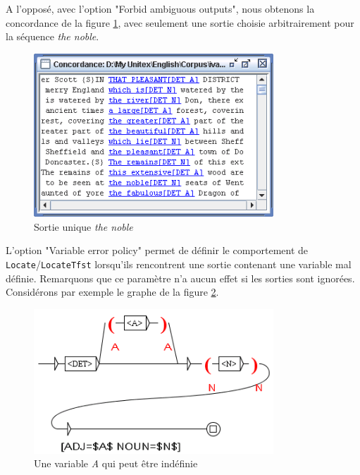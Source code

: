 \noindent A l'opposé, avec l'option "Forbid ambiguous
outputs", nous obtenons la concordance de la figure \ref{fig6-advanced-options4},
avec seulement une sortie choisie arbitrairement pour la séquence \textit{the noble}.

\bigskip
\begin{figure}[!h]
\begin{center}
\includegraphics[width=9cm]{resources/img/fig6-advanced-options4.png}
\caption{Sortie unique \textit{the noble}\label{fig6-advanced-options4}}
\end{center}
\end{figure}

\bigskip
\noindent L'option "Variable error policy" permet de définir le comportement de
\verb+Locate+/\verb+LocateTfst+ lorsqu'ils rencontrent une sortie contenant une variable mal
définie. Remarquons que ce paramètre n'a aucun effet si les sorties sont ignorées. 
Considérons par exemple le graphe de la figure
\ref{fig6-advanced-options5}. 

\bigskip
\begin{figure}[!h]
\begin{center}
\includegraphics[width=9cm]{resources/img/fig6-advanced-options5.png}
\caption{Une variable \textit{A} qui peut être indéfinie
\label{fig6-advanced-options5}}
\end{center}
\end{figure}

